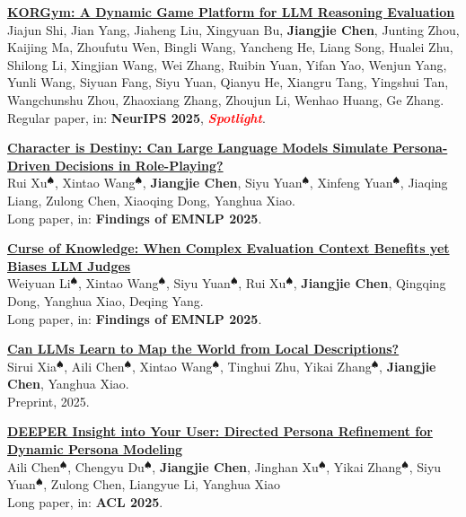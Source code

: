 \documentclass{resume}
\begin{document}
\begin{enumerate}[label={[\arabic*]}]
  \item \textbf{\href{https://jiangjiechen.github.io/publication/korgym}{KORGym: A Dynamic Game Platform for LLM Reasoning Evaluation}}\\
  \label{paper:korgym}
  Jiajun Shi, Jian Yang, Jiaheng Liu, Xingyuan Bu, \textbf{Jiangjie Chen}, Junting Zhou, Kaijing Ma, Zhoufutu Wen, Bingli Wang, Yancheng He, Liang Song, Hualei Zhu, Shilong Li, Xingjian Wang, Wei Zhang, Ruibin Yuan, Yifan Yao, Wenjun Yang, Yunli Wang, Siyuan Fang, Siyu Yuan, Qianyu He, Xiangru Tang, Yingshui Tan, Wangchunshu Zhou, Zhaoxiang Zhang, Zhoujun Li, Wenhao Huang, Ge Zhang.\\
  Regular paper, in: \textbf{NeurIPS 2025}, \textcolor{red}{\textbf{\textit{Spotlight}}}.

  \item \textbf{\href{https://arxiv.org/pdf/2404.12138.pdf}{Character is Destiny: Can Large Language Models Simulate Persona-Driven Decisions in Role-Playing?}}\\
  \label{paper:destiny}
  Rui Xu$^\spadesuit$, Xintao Wang$^\spadesuit$, \textbf{Jiangjie Chen}, Siyu Yuan$^\spadesuit$, Xinfeng Yuan$^\spadesuit$, Jiaqing Liang, Zulong Chen, Xiaoqing Dong, Yanghua Xiao.\\
  Long paper, in: \textbf{Findings of EMNLP 2025}.

  \item \textbf{\href{https://arxiv.org/pdf/2509.03419}{Curse of Knowledge: When Complex Evaluation Context Benefits yet Biases LLM Judges}}\\
  \label{paper:curseofknowledge}
  Weiyuan Li$^\spadesuit$, Xintao Wang$^\spadesuit$, Siyu Yuan$^\spadesuit$, Rui Xu$^\spadesuit$, \textbf{Jiangjie Chen}, Qingqing Dong, Yanghua Xiao, Deqing Yang.\\
  Long paper, in: \textbf{Findings of EMNLP 2025}.
  
  \item \textbf{\href{https://jiangjiechen.github.io/publication/spatialmapping}{Can LLMs Learn to Map the World from Local Descriptions?}}\\
  \label{paper:spatialmapping}
  Sirui Xia$^\spadesuit$, Aili Chen$^\spadesuit$, Xintao Wang$^\spadesuit$, Tinghui Zhu, Yikai Zhang$^\spadesuit$, \textbf{Jiangjie Chen}, Yanghua Xiao.\\
  Preprint, 2025.
  
  \item \textbf{\href{https://jiangjiechen.github.io/publication/deeper}{DEEPER Insight into Your User: Directed Persona Refinement for Dynamic Persona Modeling}}\\
  \label{paper:deeper}
  Aili Chen$^\spadesuit$, Chengyu Du$^\spadesuit$, \textbf{Jiangjie Chen}, Jinghan Xu$^\spadesuit$, Yikai Zhang$^\spadesuit$, Siyu Yuan$^\spadesuit$, Zulong Chen, Liangyue Li, Yanghua Xiao\\
  Long paper, in: \textbf{ACL 2025}.
  

\end{enumerate}
\end{document}
